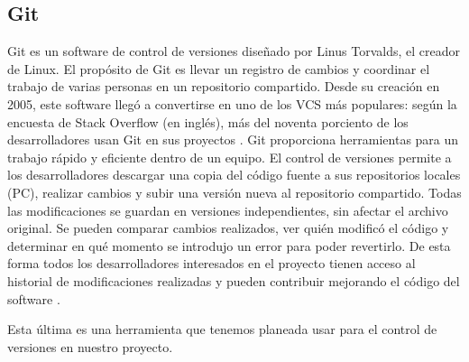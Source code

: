 \subsection{Git}

\begin{list}{}%
    {\setlength{\leftmargin}{1cm}\setlength{\rightmargin}{1cm}}
    \item\relax
    \small

Git es un software de control de versiones diseñado por Linus Torvalds, el creador de Linux. El propósito de Git es llevar un registro de cambios y coordinar el trabajo de varias personas en un repositorio compartido. Desde su creación en 2005, este software llegó a convertirse en uno de los VCS más populares: según la encuesta de Stack Overflow (en inglés), más del noventa porciento de los desarrolladores usan Git en sus proyectos \cite{CitaD20}.
Git proporciona herramientas para un trabajo rápido y eficiente dentro de un equipo. El control de versiones permite a los desarrolladores descargar una copia del código fuente a sus repositorios locales (PC), realizar cambios y subir una versión nueva al repositorio compartido. Todas las modificaciones se guardan en versiones independientes, sin afectar el archivo original. Se pueden comparar cambios realizados, ver quién modificó el código y determinar en qué momento se introdujo un error para poder revertirlo. De esta forma todos los desarrolladores interesados en el proyecto tienen acceso al historial de modificaciones realizadas y pueden contribuir mejorando el código del software \cite{CitaD21}.

\end{list}

Esta última es una herramienta que tenemos planeada usar para el control de versiones en nuestro proyecto. 
